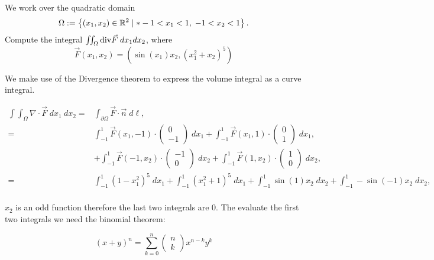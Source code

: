 \documentclass[11pt]{article}
\begin{document}
\begin{exercise}
    We work over the quadratic domain 
    \[
        \Omega := \left\{ (x_1,x_2) \in \bbR^{2} \suchthat* -1 < x_1 < 1, \; -1 < x_2 < 1 \right\}.
    \]
    Compute the integral $\iint_\Omega \mathrm{div} \vec F \;dx_1dx_2$, where 
    \[
        \vec F(x_1,x_2) = \left( \sin(x_1) x_2, \left( x_1^2 + x_2 \right)^5 \right)
    \]
\end{exercise}
\begin{solution}
 We make use of the Divergence theorem to express the volume integral as a curve integral.

\begin{align*}
\int \int_{\Omega} \nabla \cdot \vec{F} \;d x_1 \:d x_2 =&\int_{\partial \Omega}\vec{F}\cdot\vec{n} \;d\ell,\\
=&\int_{-1}^1 \vec{F}(x_1,-1)\cdot\begin{pmatrix}0\\-1\end{pmatrix} \;dx_1 + \int_{-1}^1 \vec{F}(x_1,1)\cdot\begin{pmatrix}0\\1\end{pmatrix} \;dx_1,\\
& + \int_{-1}^1 \vec{F}(-1,x_2)\cdot\begin{pmatrix}-1\\0\end{pmatrix} \;dx_2 + \int_{-1}^1 \vec{F}(1,x_2)\cdot\begin{pmatrix}1\\0\end{pmatrix} \;dx_2,\\
=&\int_{-1}^1 (1-x_1^ 2)^ 5 \;dx_1 + \int_{-1}^1 (x_1^2 + 1)^ 5 \;dx_1 + \int_{-1}^1 \sin(1)x_2\;dx_2 +  \int_{-1}^1 -\sin(-1)x_2\;dx_2,\\
\end{align*}

$x_2$ is an odd function therefore the last two integrals are 0. The evaluate the first two integrals we need the binomial theorem:

$$
(x+y)^n=\sum_{k=0}^n\left(\begin{array}{l}
n \\
k
\end{array}\right) x^{n-k} y^k
$$ 


\end{solution}
\end{document}
